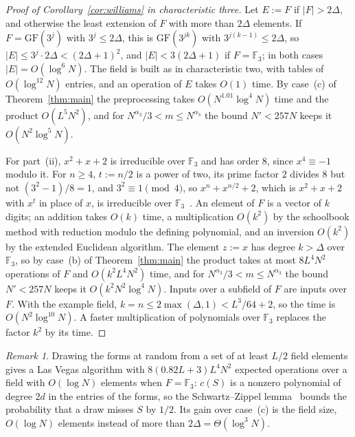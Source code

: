 \documentclass[11pt]{article}
\theoremstyle{definition}
\theoremstyle{remark}
\newtheorem{remark}[theorem]{Remark}
\newcommand{\F}{\mathbb{F}}
\newcommand{\GF}{\mathrm{GF}}
\begin{document}
\begin{proof}[Proof of Corollary~\ref{cor:williams} in characteristic three]
Let $E:=F$ if $|F|>2\Delta$, and otherwise the least extension of $F$ with more than $2\Delta$ elements. If $F=\GF(3^j)$ with $3^j\le2\Delta$, this is $\GF(3^{jk})$ with $3^{j(k-1)}\le2\Delta$, so $|E|\le3^j\cdot2\Delta<(2\Delta+1)^2$, and $|E|<3(2\Delta+1)$ if $F=\F_3$; in both cases $|E|=O(\log^6N)$. The field is built as in characteristic two, with tables of $O(\log^{12}N)$ entries, and an operation of $E$ takes $O(1)$ time. By case~(c) of Theorem~\ref{thm:main} the preprocessing takes $O(N^{1.01}\log^4N)$ time and the product $O(L^5N^2)$, and for $N^{\alpha_3}/3<m\le N^{\alpha_3}$ the bound $N'<257N$ keeps it $O(N^2\log^5N)$.

For part~(ii), $x^2+x+2$ is irreducible over $\F_3$ and has order $8$, since $x^4\equiv-1$ modulo it. For $n\ge4$, $t:=n/2$ is a power of two, its prime factor $2$ divides $8$ but not $(3^2-1)/8=1$, and $3^2\equiv1\pmod4$, so $x^n+x^{n/2}+2$, which is $x^2+x+2$ with $x^t$ in place of $x$, is irreducible over $\F_3$~\cite[Theorem~3.35]{LN97}. An element of $F$ is a vector of $k$ digits; an addition takes $O(k)$ time, a multiplication $O(k^2)$ by the schoolbook method with reduction modulo the defining polynomial, and an inversion $O(k^2)$ by the extended Euclidean algorithm. The element $z:=x$ has degree $k>\Delta$ over $\F_3$, so by case~(b) of Theorem~\ref{thm:main} the product takes at most $8L^4N^2$ operations of $F$ and $O(k^2L^4N^2)$ time, and for $N^{\alpha_3}/3<m\le N^{\alpha_3}$ the bound $N'<257N$ keeps it $O(k^2N^2\log^4N)$. Inputs over a subfield of $F$ are inputs over $F$. With the example field, $k=n\le2\max(\Delta,1)<L^3/64+2$, so the time is $O(N^2\log^{10}N)$. A faster multiplication of polynomials over $\F_3$ replaces the factor $k^2$ by its time.
\end{proof}

\begin{remark}
Drawing the forms at random from a set of at least $L/2$ field elements gives a Las Vegas algorithm with $8(0.82L+3)L^4N^2$ expected operations over a field with $O(\log N)$ elements when $F=\F_3$: $c(S)$ is a nonzero polynomial of degree $2d$ in the entries of the forms, so the Schwartz--Zippel lemma~\cite{Sch80,Zip79} bounds the probability that a draw misses $S$ by $1/2$. Its gain over case~(c) is the field size, $O(\log N)$ elements instead of more than $2\Delta=\Theta(\log^3N)$.
\end{remark}
\end{document}
